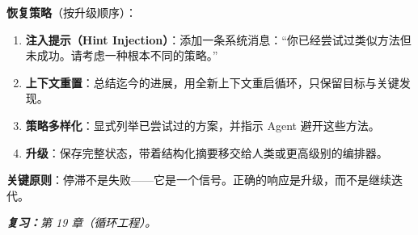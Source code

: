 \begin{questionbox}
\textbf{恢复策略}（按升级顺序）：
\begin{enumerate}
  \item \textbf{注入提示（Hint Injection）}：添加一条系统消息：“你已经尝试过类似方法但未成功。请考虑一种根本不同的策略。”
  \item \textbf{上下文重置}：总结迄今的进展，用全新上下文重启循环，只保留目标与关键发现。
  \item \textbf{策略多样化}：显式列举已尝试过的方案，并指示 Agent 避开这些方法。
  \item \textbf{升级}：保存完整状态，带着结构化摘要移交给人类或更高级别的编排器。
\end{enumerate}

\textbf{关键原则}：停滞不是失败——它是一个信号。正确的响应是升级，而不是继续迭代。

\emph{\textbf{复习：}第 19 章（循环工程）。}
\end{questionbox}

